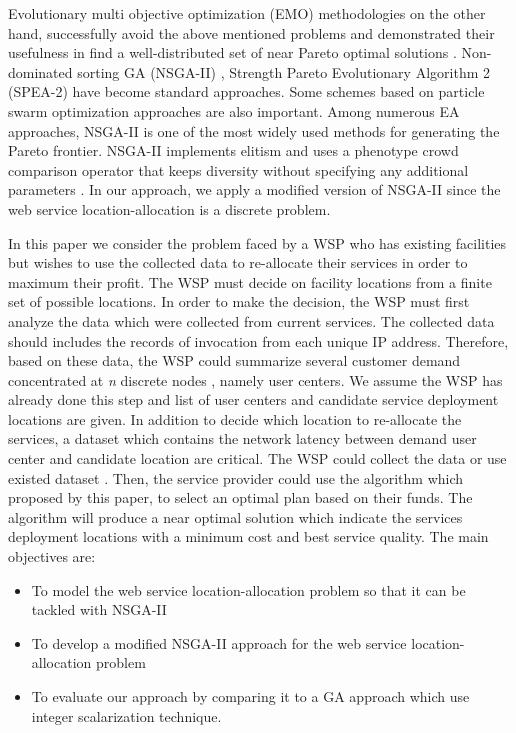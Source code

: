 \documentclass[11pt, a4paper, oneside, openright]{article}
\begin{document}
Evolutionary multi objective optimization (EMO) methodologies on the other hand, successfully avoid the above mentioned problems and demonstrated their usefulness in find a well-distributed set of near Pareto optimal solutions \cite{Aboolian200964}. Non-dominated sorting GA (NSGA-II) \cite{996017}, Strength Pareto Evolutionary Algorithm 2 (SPEA-2) \cite{Deb:2005:EED:1109044.1109049} have become standard approaches. 
Some schemes based on particle swarm optimization approaches \cite{Elhossini:2010:SPP:1739146.1739151, Huang:2006:CLP:1108677.1108683} are also important. 
Among numerous EA approaches, NSGA-II is one of the most widely used methods for generating the Pareto frontier. 
NSGA-II implements elitism and uses a phenotype crowd comparison operator that keeps diversity without specifying any additional parameters \cite{Deb06referencepoint}.
In our approach, we apply a modified version of NSGA-II since the web service location-allocation is a discrete problem. 

In this paper we consider the problem faced by a WSP who has existing facilities but wishes to use the collected data to re-allocate their services in order to maximum their profit.
The WSP must decide on facility locations from a finite set of possible locations. 
In order to make the decision, the WSP must first analyze the data which were collected from current services. 
The collected data should includes the records of invocation from each unique IP address.
Therefore, based on these data, the WSP could summarize several customer demand concentrated at \textit{n} discrete nodes \cite{Aboolian200964}, namely user centers. 
We assume the WSP has already done this step and list of user centers and candidate service deployment locations are given.
In addition to decide which location to re-allocate the services, a dataset which contains the network latency between demand user center and candidate location are critical. 
The WSP could collect the data or use existed dataset \cite{5552800, 6076756}. 
Then, the service provider could use the algorithm which proposed by this paper, to select an optimal plan based on their funds. 
The algorithm will produce a near optimal solution which indicate the services deployment locations with a minimum cost and best service quality.
The main objectives are:
\begin{itemize}
	\item To model the web service location-allocation problem so that it can be tackled with NSGA-II
	\item To develop a modified NSGA-II approach for the web service location-allocation problem
	\item To evaluate our approach by comparing it to a GA approach which use integer scalarization technique.
\end{itemize}
\end{document}
